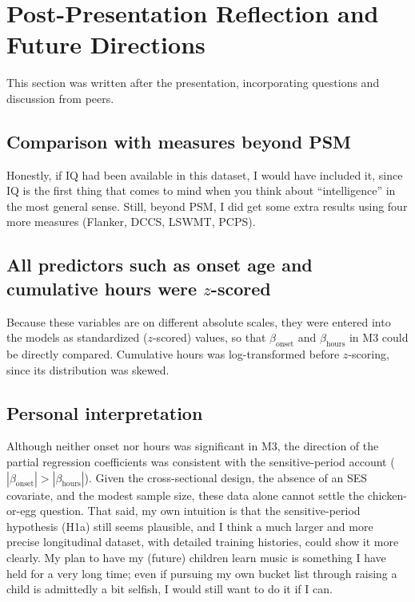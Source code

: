\documentclass[11pt]{article}
\begin{document}
\section{Post-Presentation Reflection and Future Directions}
This section was written after the presentation, incorporating questions and discussion from peers.

\subsection{Comparison with measures beyond PSM}
Honestly, if IQ had been available in this dataset, I would have included it, since IQ is the first thing that comes to mind when you think about ``intelligence'' in the most general sense. Still, beyond PSM, I did get some extra results using four more measures (Flanker, DCCS, LSWMT, PCPS).

\subsection{All predictors such as onset age and cumulative hours were $z$-scored}
Because these variables are on different absolute scales, they were entered into the models as standardized ($z$-scored) values, so that $\beta_{\mathrm{onset}}$ and $\beta_{\mathrm{hours}}$ in M3 could be directly compared. Cumulative hours was log-transformed before $z$-scoring, since its distribution was skewed.

\subsection{Personal interpretation}
Although neither onset nor hours was significant in M3, the direction of the partial regression coefficients was consistent with the sensitive-period account ($|\beta_{\mathrm{onset}}| > |\beta_{\mathrm{hours}}|$). Given the cross-sectional design, the absence of an SES covariate, and the modest sample size, these data alone cannot settle the chicken-or-egg question. That said, my own intuition is that the sensitive-period hypothesis (H1a) still seems plausible, and I think a much larger and more precise longitudinal dataset, with detailed training histories, could show it more clearly. My plan to have my (future) children learn music is something I have held for a very long time; even if pursuing my own bucket list through raising a child is admittedly a bit selfish, I would still want to do it if I can.
\end{document}
